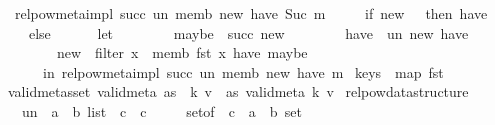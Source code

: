 \begin{isabellebody}
\ \ {\isachardoublequoteopen}relpow{\isacharunderscore}{\kern0pt}meta{\isacharunderscore}{\kern0pt}impl\ succ\ un\ memb\ new\ have\ {\isacharparenleft}{\kern0pt}Suc\ m{\isacharparenright}{\kern0pt}\ {\isacharequal}{\kern0pt}\isanewline
\ \ \ \ {\isacharparenleft}{\kern0pt}if\ new\ {\isacharequal}{\kern0pt}\ {\isacharbrackleft}{\kern0pt}{\isacharbrackright}{\kern0pt}\ then\ have\isanewline
\ \ \ \ else\isanewline
\ \ \ \ \ \ let\isanewline
\ \ \ \ \ \ \ \ maybe\ {\isacharequal}{\kern0pt}\ succ\ new{\isacharsemicolon}{\kern0pt}\isanewline
\ \ \ \ \ \ \ \ have{\isacharprime}{\kern0pt}\ {\isacharequal}{\kern0pt}\ un\ new\ have{\isacharsemicolon}{\kern0pt}\isanewline
\ \ \ \ \ \ \ \ new{\isacharprime}{\kern0pt}\ {\isacharequal}{\kern0pt}\ filter\ {\isacharparenleft}{\kern0pt}{\isasymlambda}x{\isachardot}{\kern0pt}\ {\isasymnot}\ memb\ {\isacharparenleft}{\kern0pt}fst\ x{\isacharparenright}{\kern0pt}\ have{\isacharprime}{\kern0pt}{\isacharparenright}{\kern0pt}\ maybe\isanewline
\ \ \ \ \ \ in\ relpow{\isacharunderscore}{\kern0pt}meta{\isacharunderscore}{\kern0pt}impl\ succ\ un\ memb\ new{\isacharprime}{\kern0pt}\ have{\isacharprime}{\kern0pt}\ m{\isacharparenright}{\kern0pt}{\isachardoublequoteclose}\isanewline
\isanewline
{}\isamarkupfalse%
\ {\isachardoublequoteopen}keys\ {\isasymequiv}\ map\ fst{\isachardoublequoteclose}\isanewline
\isanewline
{}\isamarkupfalse%
\ {\isachardoublequoteopen}valid{\isacharunderscore}{\kern0pt}metas{\isacharunderscore}{\kern0pt}set\ valid{\isacharunderscore}{\kern0pt}meta\ as\ {\isasymequiv}\ {\isacharparenleft}{\kern0pt}{\isasymforall}{\isacharparenleft}{\kern0pt}k{\isacharcomma}{\kern0pt}\ v{\isacharparenright}{\kern0pt}\ {\isasymin}\ as{\isachardot}{\kern0pt}\ valid{\isacharunderscore}{\kern0pt}meta\ k\ v{\isacharparenright}{\kern0pt}{\isachardoublequoteclose}\isanewline
\isanewline
{}\isamarkupfalse%
\ relpow{\isacharunderscore}{\kern0pt}data{\isacharunderscore}{\kern0pt}structure\ {\isacharequal}{\kern0pt}\isanewline
\ \ \ un\ {\isacharcolon}{\kern0pt}{\isacharcolon}{\kern0pt}\ {\isachardoublequoteopen}{\isacharparenleft}{\kern0pt}{\isacharprime}{\kern0pt}a\ {\isacharasterisk}{\kern0pt}\ {\isacharprime}{\kern0pt}b{\isacharparenright}{\kern0pt}\ list\ {\isasymRightarrow}\ {\isacharprime}{\kern0pt}c\ {\isasymRightarrow}\ {\isacharprime}{\kern0pt}c{\isachardoublequoteclose}\isanewline
\ \ \ \ \ set{\isacharunderscore}{\kern0pt}of\ {\isacharcolon}{\kern0pt}{\isacharcolon}{\kern0pt}\ {\isachardoublequoteopen}{\isacharprime}{\kern0pt}c\ {\isasymRightarrow}\ {\isacharparenleft}{\kern0pt}{\isacharprime}{\kern0pt}a\ {\isacharasterisk}{\kern0pt}\ {\isacharprime}{\kern0pt}b{\isacharparenright}{\kern0pt}\ set{\isachardoublequoteclose}\isanewline

\end{isabellebody}
